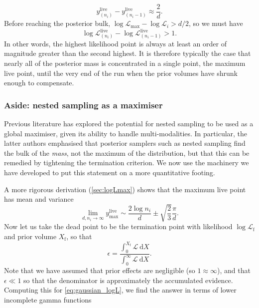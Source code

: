 \documentclass[usenatbib]{mnras}
\newcommand{\nlive}{n_i}
\newcommand{\Like}{\mathcal{L}}
\newcommand{\logLmax}{\log \Like_\mathrm{max}}
\begin{document}
\begin{equation}
    y_{(\nlive)}^{\mathrm{live}} - y_{(\nlive - 1)}^{\mathrm{live}} \approx \frac{2}{d}.
\end{equation}
Before reaching the posterior bulk, $\logLmax - \log\Like_i > d/2$, so we must have
\begin{equation}
    \log \Like^{\mathrm{live}}_{(\nlive)} - \log \Like^\mathrm{live}_{(\nlive - 1)} > 1.
\end{equation}
In other words, the highest likelihood point is always at least an order of magnitude greater than the second highest. It is therefore typically the case that nearly all of the posterior mass is concentrated in a single point, the maximum live point, until the very end of the run when the prior volumes have shrunk enough to compensate.

\subsubsection*{Aside: nested sampling as a maximiser}
Previous literature \citep{Akrami_2010, Feroz_2011} has explored the potential for nested sampling to be used as a global maximiser, given its ability to handle multi-modalities. In particular, the latter authors emphasised that posterior samplers such as nested sampling find the bulk of the \textit{mass}, not the maximum of the distribution, but that this can be remedied by tightening the termination criterion. We now use the machinery we have developed to put this statement on a more quantitative footing. 
\par
A more rigorous derivation (\cref{sec:logLmax}) shows that the maximum live point has mean and variance
\begin{equation}\label{eq:ylivemax}
	\lim_{d,\nlive\to\infty} y_\mathrm{max}^\mathrm{live} \sim \frac{2\log \nlive}{d} \pm \sqrt{\frac{2}{3}}\frac{\pi}{d}.
\end{equation}
Now let us take the dead point to be the termination point with likelihood $\log\Like_\mathrm{f}$ and prior volume $X_\mathrm{f}$, so that
\begin{equation}
	\epsilon = \frac{\int_0^{X_\mathrm{f}} \mathcal{L}\ \mathrm{d}X}{\int_0^\infty \mathcal{L}\ \mathrm{d}X}.
\end{equation}
Note that we have assumed that prior effects are negligible (so $1\approx \infty$), and that $\epsilon \ll 1$ so that the denominator is approximately the accumulated evidence. Computing this for \eqref{eq:gaussian_logL}, we find the answer in terms of lower incomplete gamma functions
\end{document}
